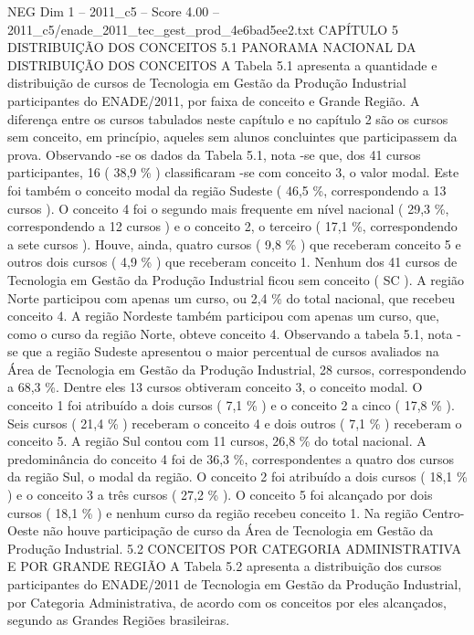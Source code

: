\begin{textsample}{NEG Dim 1 – 2011\_c5 – Score 4.00 – 2011\_c5/enade\_2011\_tec\_gest\_prod\_4e6bad5ee2.txt}  \label{ex:f1_neg_314}
CAPÍTULO 5 DISTRIBUIÇÃO DOS CONCEITOS 5.1 PANORAMA NACIONAL DA DISTRIBUIÇÃO DOS CONCEITOS A Tabela 5.1 apresenta a quantidade e distribuição de cursos de Tecnologia em Gestão da Produção Industrial participantes do ENADE/2011, por faixa de conceito e Grande Região.
A diferença entre os cursos tabulados neste capítulo e no capítulo 2 são os cursos sem conceito, em princípio, aqueles sem alunos concluintes que participassem da prova.
Observando -se os dados da Tabela 5.1, nota -se que, dos 41 cursos participantes, 16 ( 38,9 \% ) classificaram -se com conceito 3, o valor modal.
Este foi também o conceito modal da região Sudeste ( 46,5 \%, correspondendo a 13 cursos ).
O conceito 4 foi o segundo mais frequente em nível nacional ( 29,3 \%, correspondendo a 12 cursos ) e o conceito 2, o terceiro ( 17,1 \%, correspondendo a sete cursos ).
Houve, ainda, quatro cursos ( 9,8 \% ) que receberam conceito 5 e outros dois cursos ( 4,9 \% ) que receberam conceito 1.
Nenhum dos 41 cursos de Tecnologia em Gestão da Produção Industrial ficou sem conceito ( SC ).
A região Norte participou com apenas um curso, ou 2,4 \% do total nacional, que recebeu conceito 4.
A região Nordeste também participou com apenas um curso, que, como o curso da região Norte, obteve conceito 4.
Observando a tabela 5.1, nota -se que a região Sudeste apresentou o maior percentual de cursos avaliados na Área de Tecnologia em Gestão da Produção Industrial, 28 cursos, correspondendo a 68,3 \%.
Dentre eles 13 cursos obtiveram conceito 3, o conceito modal.
O conceito 1 foi atribuído a dois cursos ( 7,1 \% ) e o conceito 2 a cinco ( 17,8 \% ).
Seis cursos ( 21,4 \% ) receberam o conceito 4 e dois outros ( 7,1 \% ) receberam o conceito 5.
A região Sul contou com 11 cursos, 26,8 \% do total nacional.
A predominância do conceito 4 foi de 36,3 \%, correspondentes a quatro dos cursos da região Sul, o modal da região.
O conceito 2 foi atribuído a dois cursos ( 18,1 \% ) e o conceito 3 a três cursos ( 27,2 \% ).
O conceito 5 foi alcançado por dois cursos ( 18,1 \% ) e nenhum curso da região recebeu conceito 1.
Na região Centro-Oeste não houve participação de curso da Área de Tecnologia em Gestão da Produção Industrial. 5.2 CONCEITOS POR CATEGORIA ADMINISTRATIVA E POR GRANDE REGIÃO A Tabela 5.2 apresenta a distribuição dos cursos participantes do ENADE/2011 de Tecnologia em Gestão da Produção Industrial, por Categoria Administrativa, de acordo com os conceitos por eles alcançados, segundo as Grandes Regiões brasileiras.

\end{textsample}
